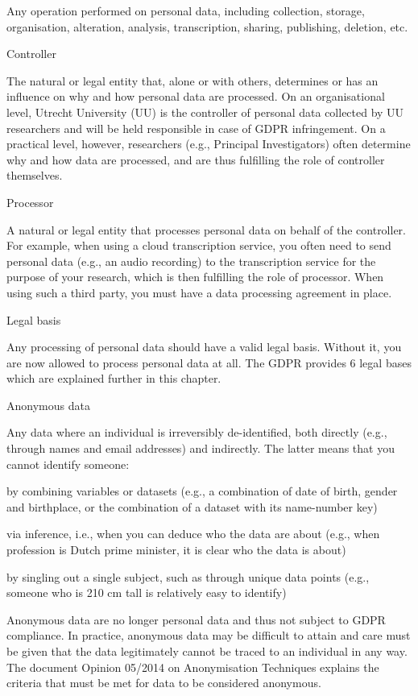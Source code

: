 \documentclass[
]{book}
\begin{document}
Any operation performed on personal data, including collection, storage, organisation,
alteration, analysis, transcription, sharing, publishing, deletion, etc.

Controller

The natural or legal entity that, alone or with others, determines or has an influence on why
and how personal data are processed. On an organisational level, Utrecht University (UU)
is the controller of personal data collected by UU researchers and will be held responsible
in case of GDPR infringement. On a practical level, however, researchers (e.g., Principal Investigators)
often determine why and how data are processed, and are thus fulfilling the role of controller themselves.

Processor

A natural or legal entity that processes personal data on behalf of the controller. For example,
when using a cloud transcription service, you often need to send personal data (e.g., an audio recording)
to the transcription service for the purpose of your research, which is then fulfilling the role
of processor. When using such a third party, you must have a
data processing agreement in place.

Legal basis

Any processing of personal data should have a valid legal basis. Without it, you are now allowed to
process personal data at all. The GDPR provides 6 legal bases which are explained further
in this chapter.

Anonymous data

Any data where an individual is irreversibly de-identified, both directly (e.g., through names and
email addresses) and indirectly. The latter means that you cannot identify someone:

by combining variables or datasets (e.g., a combination of date of birth, gender and birthplace,
or the combination of a dataset with its name-number key)

via inference, i.e., when you can deduce who the data are about (e.g., when profession is
Dutch prime minister, it is clear who the data is about)

by singling out a single subject, such as through unique data points (e.g., someone who is
210 cm tall is relatively easy to identify)

Anonymous data are no longer personal data and thus not subject to GDPR compliance. In practice,
anonymous data may be difficult to attain and care must be given that the data legitimately cannot
be traced to an individual in any way. The document
Opinion 05/2014 on Anonymisation Techniques
explains the criteria that must be met for data to be considered anonymous.
\end{document}
